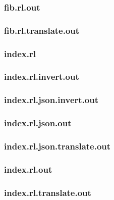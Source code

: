 \subsubsection{fib.rl.out}
\label{app:fib_rl.out}

\subsubsection{fib.rl.translate.out}
\label{app:fib_rl.translate.out}

\subsubsection{index.rl}
\label{app:index_rl}

\subsubsection{index.rl.invert.out}
\label{app:index_rl.invert.out}

\subsubsection{index.rl.json.invert.out}
\label{app:index_rl.json.invert.out}

\subsubsection{index.rl.json.out}
\label{app:index_rl.json.out}

\subsubsection{index.rl.json.translate.out}
\label{app:index_rl.json.translate.out}

\subsubsection{index.rl.out}
\label{app:index_rl.out}

\subsubsection{index.rl.translate.out}
\label{app:index_rl.translate.out}


